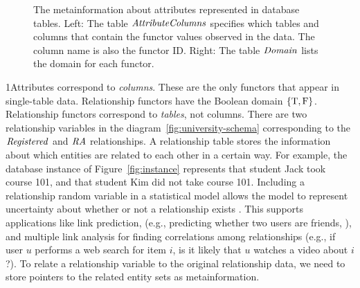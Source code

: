 \documentclass{acm_proc_article-sp}
\begin{document}
\begin{figure}[htbp] %
 \centering
{} 
\caption{The metainformation about attributes represented in database tables.  Left: The table $\it{AttributeColumns}$ specifies which tables and columns that contain the functor values observed in the data. The column name is also the functor ID. Right: The table $\it{Domain}$ lists the domain for each functor.
}
 \label{fig:attributes}
\end{figure}

1Attributes correspond to {\em columns}. These are the only functors that appear in single-table data. 
Relationship functors have the Boolean domain $\{\mathrm{T},\mathrm{F}\}$. Relationship functors correspond to {\em tables}, not columns. There are two relationship variables in the diagram~\ref{fig:university-schema} corresponding to the $\it{Registered}$ and $\it{RA}$ relationships. A relationship table stores the information about which entities are related to each other in a certain way. For example, the database instance of Figure~\ref{fig:instance} represents that student Jack took course 101, and that student Kim did not take course 101. Including a relationship random variable in a statistical model allows the model to represent uncertainty about whether or not a relationship exists \cite{linkGetoor2003}. This supports applications like link prediction, (e.g., predicting whether two users are friends, \cite{Liben-Nowell2007}), and multiple link analysis for finding correlations among relationships (e.g., if user $u$ performs a web search for item $i$, is it likely that $u$ watches a video about $i$ ?). 
%
To relate a relationship variable to the original relationship data, we need to store pointers to the related entity sets as metainformation. 
\end{document}
